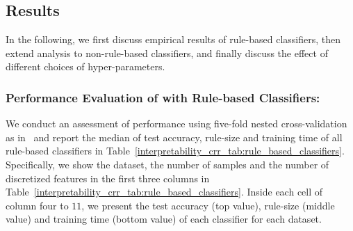 	








\subsection{Results}
In the following, we first discuss empirical results of rule-based classifiers, then extend analysis to non-rule-based classifiers, and finally discuss the effect of different choices of hyper-parameters. 
\subsubsection*{Performance Evaluation of {\crr} with Rule-based Classifiers:}
We conduct an assessment of performance  using five-fold nested cross-validation as in~\cite{DGW2018}  and report the median of test accuracy, rule-size and training time of all rule-based classifiers in Table~\ref{interpretability_crr_tab:rule_based_classifiers}. 
Specifically, we show the dataset,  the number of samples and the number of discretized features in the first three columns in Table~\ref{interpretability_crr_tab:rule_based_classifiers}. Inside each cell of column   four to $    11 $,  we present the   test accuracy (top value), rule-size (middle value) and training time (bottom value) of each classifier for each dataset. 




